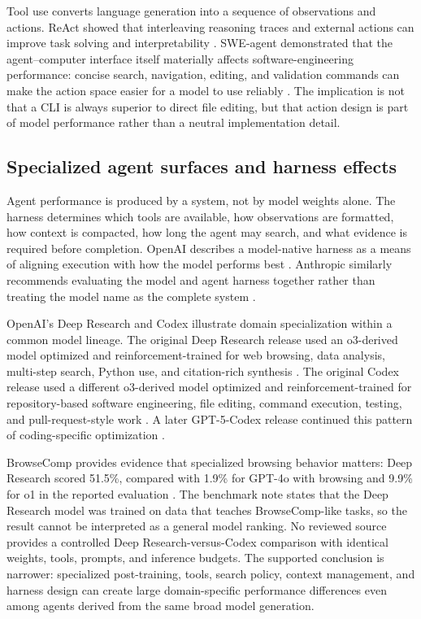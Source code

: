 \documentclass[11pt,a4paper]{article}
\begin{document}
Tool use converts language generation into a sequence of observations and actions. ReAct showed that interleaving reasoning traces and external actions can improve task solving and interpretability \cite{yao2023}. SWE-agent demonstrated that the agent--computer interface itself materially affects software-engineering performance: concise search, navigation, editing, and validation commands can make the action space easier for a model to use reliably \cite{yang2024}. The implication is not that a CLI is always superior to direct file editing, but that action design is part of model performance rather than a neutral implementation detail.

\subsection{Specialized agent surfaces and harness effects}\label{sec:lit-surfaces}

Agent performance is produced by a system, not by model weights alone. The harness determines which tools are available, how observations are formatted, how context is compacted, how long the agent may search, and what evidence is required before completion. OpenAI describes a model-native harness as a means of aligning execution with how the model performs best \cite{openaiagentssdk2026}. Anthropic similarly recommends evaluating the model and agent harness together rather than treating the model name as the complete system \cite{anthropicevals2026}.

OpenAI's Deep Research and Codex illustrate domain specialization within a common model lineage. The original Deep Research release used an o3-derived model optimized and reinforcement-trained for web browsing, data analysis, multi-step search, Python use, and citation-rich synthesis \cite{openairesearch2025}. The original Codex release used a different o3-derived model optimized and reinforcement-trained for repository-based software engineering, file editing, command execution, testing, and pull-request-style work \cite{openaicodex2025}. A later GPT-5-Codex release continued this pattern of coding-specific optimization \cite{openaicodexupgrade2025}.

BrowseComp provides evidence that specialized browsing behavior matters: Deep Research scored 51.5\%, compared with 1.9\% for GPT-4o with browsing and 9.9\% for o1 in the reported evaluation \cite{openaibrowsecomp2025}. The benchmark note states that the Deep Research model was trained on data that teaches BrowseComp-like tasks, so the result cannot be interpreted as a general model ranking. No reviewed source provides a controlled Deep Research-versus-Codex comparison with identical weights, tools, prompts, and inference budgets. The supported conclusion is narrower: specialized post-training, tools, search policy, context management, and harness design can create large domain-specific performance differences even among agents derived from the same broad model generation.
\end{document}
